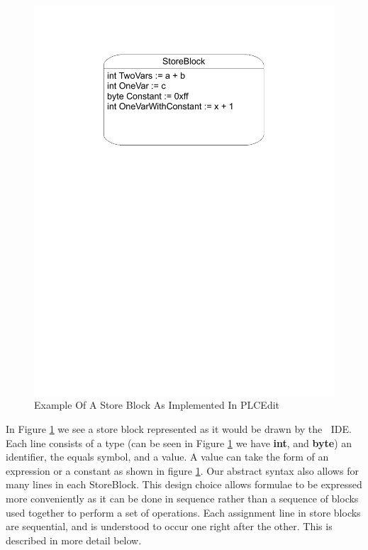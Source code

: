 \begin{figure}[htp]
    \centering
    \includegraphics[trim= 20mm 175mm 20mm 10mm, clip, width=\imgmedium]{./images/state_storeblock.pdf}
    \caption{Example Of A Store Block As Implemented In PLCEdit}
    \label{fig:state_storeblock}
\end{figure}

In Figure \ref{fig:state_storeblock} we see a store block represented as it would be drawn by the \plcchart $\:$ IDE. Each line consists of a type (can be seen in Figure \ref{fig:state_storeblock} we have \textbf{int}, and \textbf{byte}) an identifier, the equals symbol, and a value. A value can take the form of an expression or a constant as shown in figure \ref{fig:state_storeblock}. Our abstract syntax also allows for many lines in each StoreBlock. This design choice allows formulae to be expressed more conveniently as it can be done in sequence rather than a sequence of blocks used together to perform a set of operations.
Each assignment line in store blocks are sequential, and is understood to occur one right after the other. This is described in more detail below.

